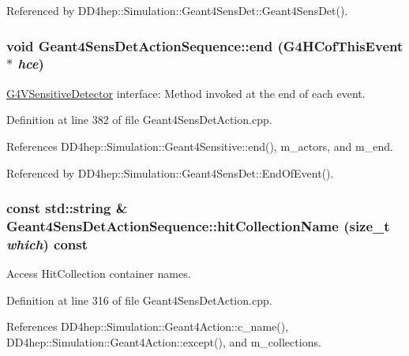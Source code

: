 Referenced by DD4hep::Simulation::Geant4SensDet::Geant4SensDet().\hypertarget{class_d_d4hep_1_1_simulation_1_1_geant4_sens_det_action_sequence_a2b7944c785413b2a479f4ba4ad2e1515}{
\subsubsection[{end}]{\setlength{\rightskip}{0pt plus 5cm}void Geant4SensDetActionSequence::end (G4HCofThisEvent $\ast$ {\em hce})}}
\label{class_d_d4hep_1_1_simulation_1_1_geant4_sens_det_action_sequence_a2b7944c785413b2a479f4ba4ad2e1515}


\hyperlink{class_g4_v_sensitive_detector}{G4VSensitiveDetector} interface: Method invoked at the end of each event. 

Definition at line 382 of file Geant4SensDetAction.cpp.

References DD4hep::Simulation::Geant4Sensitive::end(), m\_\-actors, and m\_\-end.

Referenced by DD4hep::Simulation::Geant4SensDet::EndOfEvent().\hypertarget{class_d_d4hep_1_1_simulation_1_1_geant4_sens_det_action_sequence_a6f9bd0c50d2373f56032da383468ea87}{
\subsubsection[{hitCollectionName}]{\setlength{\rightskip}{0pt plus 5cm}const std::string \& Geant4SensDetActionSequence::hitCollectionName (size\_\-t {\em which}) const}}
\label{class_d_d4hep_1_1_simulation_1_1_geant4_sens_det_action_sequence_a6f9bd0c50d2373f56032da383468ea87}


Access HitCollection container names. 

Definition at line 316 of file Geant4SensDetAction.cpp.

References DD4hep::Simulation::Geant4Action::c\_\-name(), DD4hep::Simulation::Geant4Action::except(), and m\_\-collections.

